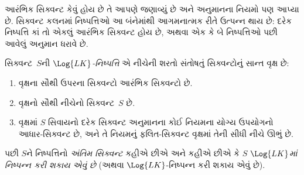 \begingroup
\makeatletter{}\makeatother


\label{guunit:OLP-0074}


\begin{explain}
આરંભિક સિક્વન્ટ કેવું હોય છે તે આપણે જણાવ્યું છે અને અનુમાનના નિયમો પણ
આપ્યા છે. સિક્વન્ટ કલનમાં નિષ્પત્તિઓ આ બંનેમાંથી આગમનાત્મક રીતે
ઉત્પન્ન થાય છે: દરેક નિષ્પત્તિ કાં તો એકલું આરંભિક સિક્વન્ટ હોય છે,
અથવા એક કે બે નિષ્પત્તિઓ પછી આવેલું અનુમાન ધરાવે છે.
\end{explain}

\begin{defn}[$\Log{LK}$-નિષ્પત્તિ]
સિક્વન્ટ~$S$ની \emph{$\Log{LK}$-નિષ્પત્તિ} એ નીચેની શરતો
સંતોષતું સિક્વન્ટોનું સાન્ત વૃક્ષ છે:
\begin{enumerate}
\item વૃક્ષના સૌથી ઉપરના સિક્વન્ટો આરંભિક સિક્વન્ટો છે.
\item વૃક્ષનો સૌથી નીચેનો સિક્વન્ટ~$S$ છે.
\item વૃક્ષમાં $S$ સિવાયનો દરેક સિક્વન્ટ અનુમાનના કોઈ નિયમના યોગ્ય
  ઉપયોગનો આધાર-સિક્વન્ટ છે, અને તે નિયમનું ફલિત-સિક્વન્ટ વૃક્ષમાં તેની
  સીધી નીચે ઊભું છે.
\end{enumerate}
પછી $S$ને નિષ્પત્તિનો \emph{અંતિમ સિક્વન્ટ} કહીએ છીએ અને કહીએ છીએ
કે $S$ \emph{$\Log{LK}$માં નિષ્પન્ન કરી શકાય એવું છે} (અથવા
$\Log{LK}$-નિષ્પન્ન કરી શકાય એવું છે).
\end{defn}

